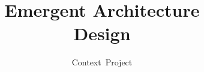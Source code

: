 \documentclass[oneside]{tudelft-report}
\begin{document}
\frontmatter

\title[Blocks World for Teams]{Emergent Architecture\\ Design}
\author{Context~Project}
\makecover



%


\mainmatter




\appendix

%


\end{document}

